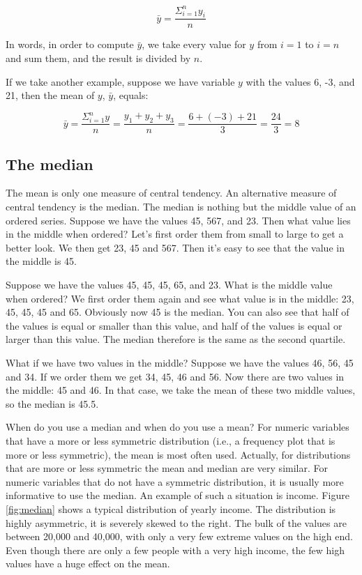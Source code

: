 \begin{equation}
\bar{y} = \frac{\Sigma_{i=1}^n y_i}{n}
\end{equation}

In words, in order to compute $\bar{y}$, we take every value for $y$ from $i=1$ to $i=n$ and sum them, and the result is divided by $n$.

If we take another example, suppose we have variable $y$ with the values {6, -3, and 21}, then the mean of $y$, $\bar{y}$, equals:

\begin{equation}
\bar{y} = \frac {  \Sigma_{i=1}^n y} {n} =    \frac{y_1 + y_2 + y_3}{n} = \frac{6 + (-3) + 21}{3} = \frac{24}{3} = 8
\end{equation}







\subsection{The median}
The mean is only one measure of central tendency. An alternative measure of central tendency is the median. The median is nothing but the middle value of an ordered series. Suppose we have the values 45, 567, and 23. Then what value lies in the middle when ordered? Let's first order them from small to large to get a better look. We then get 23, 45 and 567. Then it's easy to see that the value in the middle is 45.

Suppose we have the values 45, 45, 45, 65, and 23. What is the middle value when ordered? We first order them again and see what value is in the middle: 23, 45, 45, 45 and 65. Obviously now 45 is the median. You can also see that half of the values is equal or smaller than this value, and half of the values is equal or larger than this value. The median therefore is the same as the second quartile.

What if we have two values in the middle? Suppose we have the values 46, 56, 45 and 34. If we order them we get 34, 45, 46 and 56. Now there are two values in the middle: 45 and 46. In that case, we take the mean of these two middle values, so the median is 45.5. 

When do you use a median and when do you use a mean? For numeric variables that have a more or less symmetric distribution (i.e., a frequency plot that is more or less symmetric), the mean is most often used. Actually, for distributions that are more or less symmetric the mean and median are very similar. For numeric variables that do not have a symmetric distribution, it is usually more informative to use the median. An example of such a situation is income. Figure \ref{fig:median} shows a typical distribution of yearly income. The distribution is highly asymmetric, it is severely skewed to the right. The bulk of the values are between 20,000 and 40,000, with only a very few extreme values on the high end. Even though there are only a few people with a very high income, the few high values have a huge effect on the mean.

